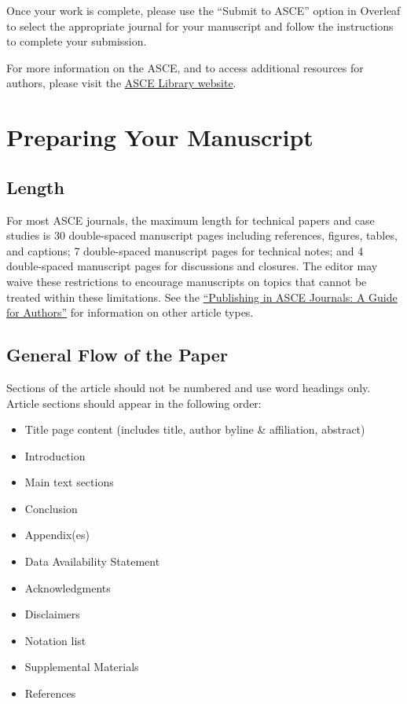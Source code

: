 \documentclass[Journal,LineNumbers]{ascelike-new}
\begin{document}
Once your work is complete, please use the ``Submit to ASCE'' option in
Overleaf to select the appropriate journal for your manuscript and
follow the instructions to complete your submission.

For more information on the ASCE, and to access additional resources for
authors, please visit the
\href{http://ascelibrary.org/page/authors}{ASCE Library website}.

\section{Preparing Your Manuscript}\label{preparing-your-manuscript}

\subsection{Length}\label{length}

For most ASCE journals, the maximum length for technical papers and case
studies is 30 double-spaced manuscript pages including references,
figures, tables, and captions; 7 double-spaced manuscript pages for
technical notes; and 4 double-spaced manuscript pages for discussions
and closures. The editor may waive these restrictions to encourage
manuscripts on topics that cannot be treated within these limitations.
See the
\href{https://ascelibrary.org/doi/pdf/10.1061/9780784479018}{``Publishing
in ASCE Journals: A Guide for Authors''} for information on other
article types.

\subsection{General Flow of the Paper}\label{general-flow-of-the-paper}

Sections of the article should not be numbered and use word headings
only. Article sections should appear in the following order:

\begin{itemize}
\item
  Title page content (includes title, author byline \& affiliation,
  abstract)
\item
  Introduction
\item
  Main text sections
\item
  Conclusion
\item
  Appendix(es)
\item
  Data Availability Statement
\item
  Acknowledgments
\item
  Disclaimers
\item
  Notation list
\item
  Supplemental Materials
\item
  References
\end{itemize}
\end{document}
